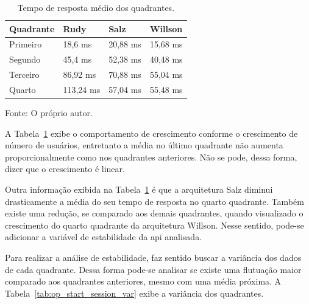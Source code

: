 \begin{table}[htb!]
\centering
\begin{adjustbox}{max width=\textwidth}
\caption{Tempo de resposta médio dos quadrantes.}
\label{tab:op_start_session}
\begin{tabular}{l|l|l|l}

\hline \hline

Quadrante & Rudy    & Salz    & Willson \\ \hline \hline

Primeiro  & 18,6 ms & 20,88 ms & 15,68 ms \\ \hline

Segundo   & 45,4 ms & 52,38 ms & 40,48 ms \\ \hline

Terceiro  & 86,92 ms & 70,88 ms & 55,04 ms \\ \hline

Quarto    & 113,24 ms & 57,04 ms & 55,48 ms \\ \hline \hline

\end{tabular}

\end{adjustbox}

Fonte: O próprio autor.
\end{table}

A Tabela~\ref{tab:op_start_session} exibe o comportamento de crescimento conforme o crescimento de número de usuários, entretanto a média no último quadrante não aumenta proporcionalmente como nos quadrantes anteriores.
%
Não se pode, dessa forma, dizer que o crescimento é linear.

Outra informação exibida na Tabela~\ref{tab:op_start_session} é que a arquitetura Salz diminui drasticamente a média do seu tempo de resposta no quarto quadrante.
%
Também existe uma redução, se comparado aos demais quadrantes, quando visualizado o crescimento do quarto quadrante da arquitetura Willson.
%
Nesse sentido, pode-se adicionar a variável de estabilidade da \ac{api} analisada.

Para realizar a análise de estabilidade, faz sentido buscar a variância dos dados de cada quadrante.
%
Dessa forma pode-se analisar se existe uma flutuação maior comparado aos quadrantes anteriores, mesmo com uma média próxima.
%
A Tabela~\ref{tab:op_start_session_var} exibe a variância dos quadrantes.


